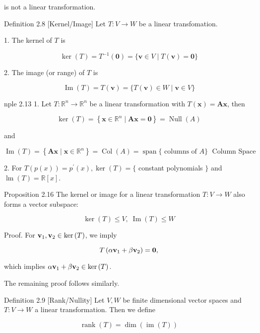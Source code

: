 \documentclass[11pt]{article}
\begin{document}
is not a linear transformation.

Definition 2.8 [Kernel/Image] Let \(T : V \rightarrow  W\) be a linear transfomation.

1. The kernel of \(T\) is

\[
\ker \left( T\right)  = {T}^{-1}\left( \mathbf{0}\right)  = \{ \mathbf{v} \in  V \mid  T\left( \mathbf{v}\right)  = \mathbf{0}\}
\]

2. The image (or range) of \(T\) is

\[
\operatorname{Im}\left( T\right)  = T\left( \mathbf{v}\right)  = \{ T\left( \mathbf{v}\right)  \in  W \mid  \mathbf{v} \in  V\}
\]

nple 2.13 1. Let \(T : {\mathbb{R}}^n \rightarrow  {\mathbb{R}}^n\) be a linear transformation with \(T\left( \mathbf{x}\right)  = \mathbf{{Ax}}\), then

\[
\ker \left( T\right)  = \left\{  {\mathbf{x} \in  {\mathbb{R}}^n \mid  \mathbf{{Ax}} = \mathbf{0}}\right\}   = \operatorname{Null}\left( A\right)
\]

and

\[
\operatorname{Im}\left( T\right)  = \left\{  {\mathbf{{Ax}} \mid  \mathbf{x} \in  {\mathbb{R}}^n}\right\}   = \operatorname{Col}\left( A\right)  = \operatorname{span}\{ \text{ columns of }A\} \;\text{ Column Space }
\]

2. For \(T\left( {p\left( x\right) }\right)  = {p}^{\prime }\left( x\right) ,\ker \left( T\right)  = \{\) constant polynomials \(\}\) and \(\operatorname{lm}\left( T\right)  = \mathbb{R}\left\lbrack  x\right\rbrack\).

Proposition 2.16 The kernel or image for a linear transformation \(T : V \rightarrow  W\) also forms a vector subspace:

\[
\ker \left( T\right)  \leq  V,\;\operatorname{Im}\left( T\right)  \leq  W
\]

Proof. For \({\bf v}_1,{\bf v}_2 \in  \ker \left( T\right)\), we imply

\[
T\left( {\alpha {\bf v}_1 + \beta {\bf v}_2}\right)  = \mathbf{0},
\]

which implies \(\alpha {\bf v}_1 + \beta {\bf v}_2 \in  \ker \left( T\right)\).

The remaining proof follows similarly.

Definition 2.9 [Rank/Nullity] Let \(V,W\) be finite dimensional vector spaces and \(T : V \rightarrow  W\) a linear transformation. Then we define

\[
\operatorname{rank}\left( T\right)  = \dim \left( {\operatorname{im}\left( T\right) }\right)
\]
\end{document}
